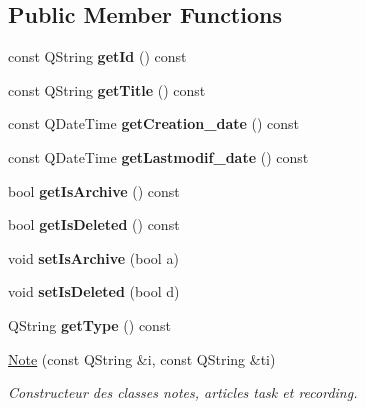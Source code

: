 \subsection*{Public Member Functions}
\begin{DoxyCompactItemize}
\item 
\mbox{\label{class_note_a8a7271e7e9f3fcc04944361f7ea0b846}} 
const Q\+String {\bfseries get\+Id} () const
\item 
\mbox{\label{class_note_a7cd1137ae025c9495c5c24b1db90cbb3}} 
const Q\+String {\bfseries get\+Title} () const
\item 
\mbox{\label{class_note_af29efb383791ec5d16f6db3fb5c7205d}} 
const Q\+Date\+Time {\bfseries get\+Creation\+\_\+date} () const
\item 
\mbox{\label{class_note_a394327fab9f02f4d4e87b3ee78d99121}} 
const Q\+Date\+Time {\bfseries get\+Lastmodif\+\_\+date} () const
\item 
\mbox{\label{class_note_a8fc3517be2c98114e1912080b7f12d57}} 
bool {\bfseries get\+Is\+Archive} () const
\item 
\mbox{\label{class_note_a76e4262b2c064b8ec4791ab1316d5568}} 
bool {\bfseries get\+Is\+Deleted} () const
\item 
\mbox{\label{class_note_a4174e5bcefa138c9e5d55b34239b2e5d}} 
void {\bfseries set\+Is\+Archive} (bool a)
\item 
\mbox{\label{class_note_ae112c975e37801222608656927568a37}} 
void {\bfseries set\+Is\+Deleted} (bool d)
\item 
\mbox{\label{class_note_ad6325df1dc1410d7854cac36ff312b8c}} 
Q\+String {\bfseries get\+Type} () const
\item 
\hyperlink{class_note_a0490153115307d5f59974d7000260e48}{Note} (const Q\+String \&i, const Q\+String \&ti)
\begin{DoxyCompactList}\small\item\em Constructeur des classes notes, articles task et recording. \end{DoxyCompactList}\item 

\end{DoxyCompactItemize}
